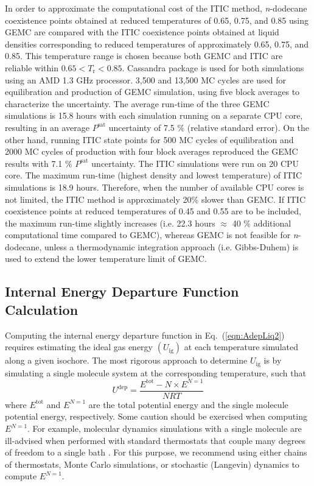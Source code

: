 \documentclass[5p,times]{elsarticle}
\begin{document}
In order to approximate the computational cost of the ITIC method, \textit{n}-dodecane  coexistence points obtained at reduced temperatures of 0.65, 0.75, and 0.85 using  GEMC are compared with the ITIC coexistence points obtained at liquid densities corresponding to reduced temperatures of approximately 0.65, 0.75, and 0.85. This temperature range is chosen because both  GEMC and ITIC are reliable within $0.65<T_\mathrm{r}<0.85$. Cassandra package is used for both simulations using an AMD 1.3 GHz processor. 3,500 and 13,500 MC cycles are used for equilibration and production of GEMC simulation, using five block averages to characterize the uncertainty. The average run-time of the three GEMC simulations is 15.8 hours with each simulation running on a separate CPU core, resulting in an average $P^\mathrm{sat}$ uncertainty of 7.5 \% (relative standard error). On the other hand, running ITIC state points for 500 MC cycles of equilibration and 2000 MC cycles of production with four block averages reproduced the GEMC results with 7.1 \% $P^\mathrm{sat}$ uncertainty. The ITIC simulations were run on 20 CPU core. The maximum run-time (highest density and lowest temperature) of ITIC simulations is 18.9 hours. Therefore, when the number of available CPU cores is not limited, the ITIC method is approximately 20\% slower than GEMC. If ITIC coexistence points at reduced temperatures of 0.45 and 0.55 are to be included, the maximum run-time slightly increases (i.e. 22.3 hours $\approx$ 40 \% additional computational time compared to GEMC), whereas GEMC is not feasible for \textit{n}-dodecane, unless a thermodynamic integration approach (i.e. Gibbs-Duhem) is used to extend the lower temperature limit of GEMC.

\subsection{Internal Energy Departure Function Calculation}\label{sec:udepCalc}

Computing the internal energy departure function in Eq.~(\ref{eqn:AdepLiq2}) requires estimating the ideal gas energy $(U_{\mathrm{ig}})$ at each temperature simulated along a given isochore. The most rigorous approach to determine $U_{\mathrm{ig}}$ is by simulating a single molecule system at the corresponding temperature, such that
\begin{equation}\label{eqn:uDep single molecule}
U^{\mathrm{dep}} = \frac{E^{\mathrm{tot}} - N \times E^{N=1}}{NRT}
\end{equation}
where $E^{\mathrm{tot}}$ and $E^{N=1}$ are the total potential energy and the single molecule potential energy, respectively. Some caution should be exercised when computing $E^{N=1}$. For example, molecular dynamics simulations with a single molecule are ill-advised when performed with standard thermostats that couple many degrees of freedom to a single bath \cite{Merz2018}. For this purpose, we recommend using either chains of thermostats, Monte Carlo simulations, or stochastic (Langevin) dynamics \cite{Goga2012Langevin} to compute $E^{N=1}$.
\end{document}
